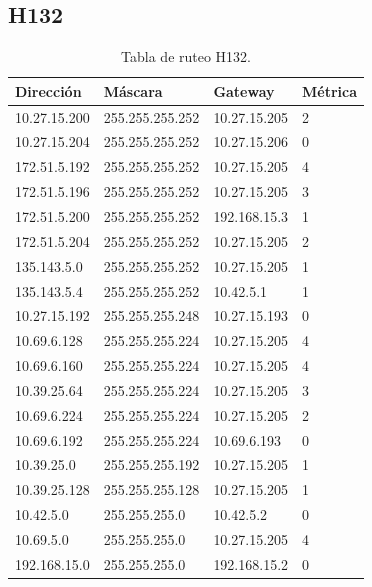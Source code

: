 \documentclass[12pt,titlepage]{article}
\begin{document}
\subsection{H132}
\begin{table}
  \begin{center}
    \begin{tabular}{|l|l|l|l|}
      \hline
        \bf{Direcci\'on} & \bf{M\'ascara} & \bf{Gateway} & \bf{M\'etrica} \\
      \hline 
	10.27.15.200  & 255.255.255.252 & 10.27.15.205 & 2 \\
        10.27.15.204  & 255.255.255.252 & 10.27.15.206 & 0 \\
        172.51.5.192  & 255.255.255.252 & 10.27.15.205 & 4 \\
        172.51.5.196  & 255.255.255.252 & 10.27.15.205 & 3 \\
        172.51.5.200  & 255.255.255.252 & 192.168.15.3 & 1 \\
        172.51.5.204  & 255.255.255.252 & 10.27.15.205 & 2 \\
        135.143.5.0   & 255.255.255.252 & 10.27.15.205 & 1 \\
        135.143.5.4   & 255.255.255.252 & 10.42.5.1 & 1 \\ 	
	10.27.15.192  & 255.255.255.248 & 10.27.15.193 & 0 \\
	10.69.6.128   & 255.255.255.224 & 10.27.15.205 & 4 \\
        10.69.6.160   & 255.255.255.224 & 10.27.15.205 & 4 \\
	10.39.25.64   & 255.255.255.224 & 10.27.15.205 & 3 \\       
	10.69.6.224   & 255.255.255.224 & 10.27.15.205 & 2 \\
	10.69.6.192   & 255.255.255.224 & 10.69.6.193 & 0 \\	
	10.39.25.0    & 255.255.255.192 & 10.27.15.205 & 1 \\
	10.39.25.128  & 255.255.255.128 & 10.27.15.205 & 1 \\
	10.42.5.0     & 255.255.255.0 & 10.42.5.2 & 0 \\
        10.69.5.0     & 255.255.255.0 & 10.27.15.205 & 4 \\
        192.168.15.0  & 255.255.255.0 & 192.168.15.2 & 0 \\  
    \hline
    \end{tabular} \\
  \end{center}
  \caption{Tabla de ruteo H132.}
\end{table}
\newpage
\end{document}
